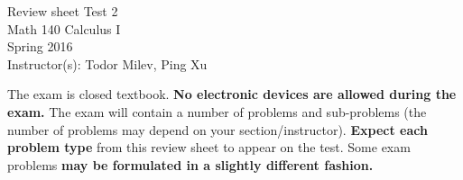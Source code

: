 \documentclass{article}
\begin{document}
\begin{center}
\Large
Review sheet Test 2 \\ Math 140 Calculus I \\ \normalsize Spring 2016 \\ Instructor(s): Todor Milev, Ping Xu
\end{center}



\noindent The exam is closed textbook. \textbf{No electronic devices are allowed during the exam. } The exam will contain a number of problems and sub-problems (the number of problems may depend on your section/instructor). \textbf{Expect each problem type} from this review sheet to appear on the test. Some exam problems \textbf{may be formulated in a slightly different fashion.}%
\end{document}
